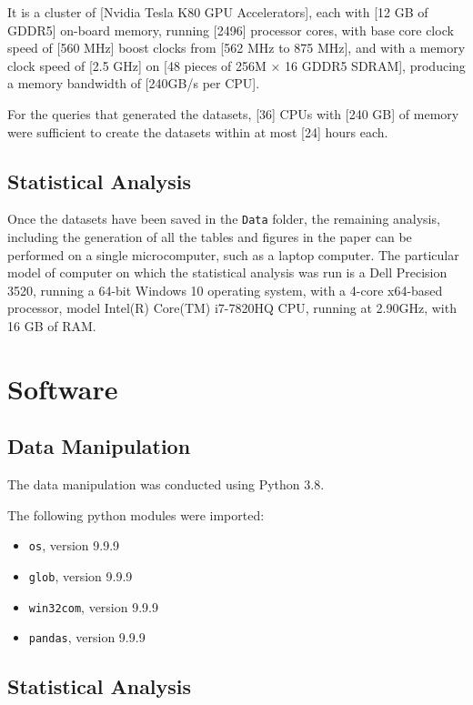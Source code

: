 \documentclass[11pt]{paper}
\begin{document}
It is a cluster of
[Nvidia Tesla K80 GPU Accelerators],
each with [12 GB of GDDR5] on-board memory, 
running
[2496] processor cores, 
with base core clock speed of [560 MHz]
boost clocks from [562 MHz to 875 MHz], 
and with a memory clock speed of [2.5 GHz] on
[48 pieces of 256M × 16 GDDR5 SDRAM], 
producing a memory bandwidth of [240GB/s per CPU]. 

For the queries that generated the datasets, 
[36] CPUs with [240 GB] of memory were sufficient
to create the datasets within at most [24] hours each. 


\subsection*{Statistical Analysis}

Once the datasets have been saved in the \texttt{Data} folder, 
the remaining analysis, including the generation of all the tables
and figures in the paper can be performed on a single microcomputer, 
such as a laptop computer.
The particular model of computer 
on which the statistical analysis was run
is a 
Dell Precision 3520,
running a 64-bit Windows 10 operating system, 
with a 4-core x64-based processor,
model Intel(R) Core(TM) i7-7820HQ CPU, 
running at 2.90GHz, 
with 16 GB of RAM.


\section*{Software}

\subsection*{Data Manipulation}

The data manipulation was conducted using 
Python 3.8. 


The following python modules were imported:

\begin{itemize}

\item \texttt{os}, version 9.9.9
\item \texttt{glob}, version 9.9.9
\item \texttt{win32com}, version 9.9.9
\item \texttt{pandas}, version 9.9.9

\end{itemize}


\subsection*{Statistical Analysis}
\end{document}
